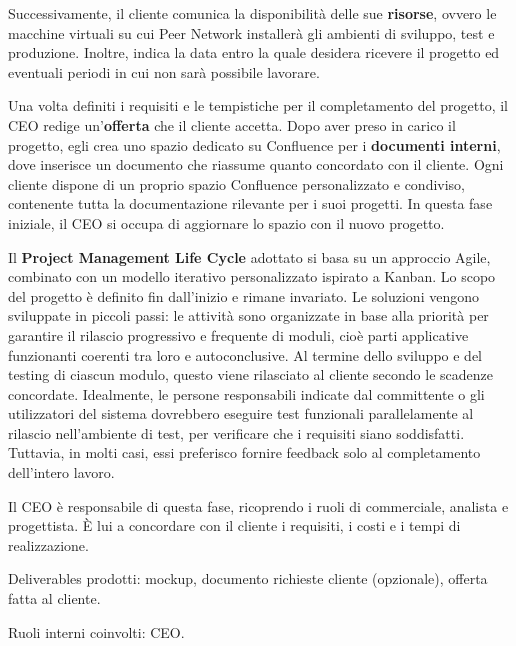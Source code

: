     Successivamente, il cliente comunica la disponibilità delle sue \textbf{risorse}, ovvero le macchine virtuali su cui Peer Network
    installerà gli ambienti di sviluppo, test e produzione. Inoltre, indica la data entro la quale desidera ricevere il progetto
    ed eventuali periodi in cui non sarà possibile lavorare.

    Una volta definiti i requisiti e le tempistiche per il completamento del progetto, il CEO redige un’\textbf{offerta} che il cliente
    accetta. Dopo aver preso in carico il progetto, egli crea uno spazio dedicato su Confluence per i \textbf{documenti interni}, dove
    inserisce un documento che riassume quanto concordato con il cliente. Ogni cliente dispone
    di un proprio spazio Confluence personalizzato e condiviso, contenente tutta la documentazione rilevante per i suoi progetti.
    In questa fase iniziale, il CEO si occupa di aggiornare lo spazio con il nuovo progetto.

    Il \textbf{Project Management Life Cycle} adottato si basa su un approccio Agile, combinato con un modello iterativo personalizzato
    ispirato a Kanban. Lo scopo del progetto è definito fin dall'inizio e rimane invariato. Le soluzioni vengono sviluppate in
    piccoli passi: le attività sono organizzate in base alla priorità per garantire il rilascio progressivo e frequente di moduli,
    cioè parti applicative funzionanti coerenti tra loro e autoconclusive. Al termine dello sviluppo e del testing di ciascun modulo,
    questo viene rilasciato al cliente  secondo le scadenze concordate. Idealmente, le persone responsabili indicate dal committente o
    gli utilizzatori del sistema dovrebbero eseguire test funzionali
    parallelamente al rilascio nell’ambiente di test, per verificare che i requisiti siano soddisfatti. Tuttavia, in molti casi, essi
    preferisco fornire feedback solo al completamento dell'intero lavoro.

    Il CEO è responsabile di questa fase, ricoprendo i ruoli di commerciale, analista e progettista. È lui a concordare con il cliente i requisiti, i costi e i tempi di realizzazione.

    Deliverables prodotti: mockup, documento richieste cliente (opzionale), offerta fatta al cliente.

    Ruoli interni coinvolti: CEO.

